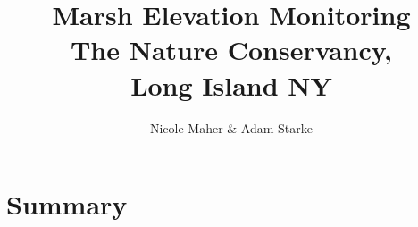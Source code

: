\documentclass{article}
\begin{document}
\title{Marsh Elevation Monitoring\\
The Nature Conservancy, \\
Long Island NY}
\author{Nicole Maher \& Adam Starke}
\maketitle\thispagestyle{empty}

\section{Summary}
\end{document}
